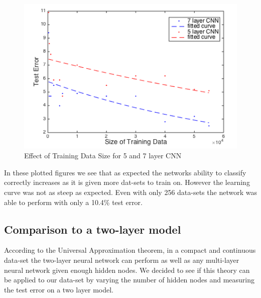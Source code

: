 \documentclass[12pt, twocolumn]{article}
\begin{document}
\begin{figure}
\includegraphics[scale=.5]{trainingsize.png}
\caption{Effect of Training Data Size for 5 and 7 layer CNN}
\label{fig:trainsize}
\end{figure}


In these plotted figures we see that as expected the networks ability to classify correctly increases as it is given more dat-sets to train on. However the learning curve was not as steep as expected. Even with only 256 data-sets the network was able to perform with only a 10.4\% test error.

\subsection{Comparison to a two-layer model}
According to the Universal Approximation theorem, in a compact and continuous data-set the two-layer neural network can perform as well as any multi-layer neural network given enough hidden nodes. We decided to see if this theory can be applied to our data-set by varying the number of hidden nodes and measuring the test error on a two layer model.
 
\end{document}
